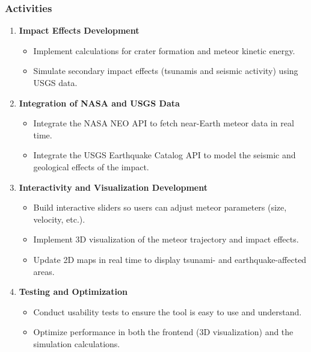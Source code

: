 \documentclass[conference]{IEEEtran}
\begin{document}
\subsubsection*{Activities}
\begin{enumerate}
	\item \textbf{Impact Effects Development}
	      \begin{itemize}
		      \item Implement calculations for crater formation and meteor kinetic
		            energy.
		      \item Simulate secondary impact effects (tsunamis and seismic activity)
		            using USGS data.
	      \end{itemize}
	\item \textbf{Integration of NASA and USGS Data}
	      \begin{itemize}
		      \item Integrate the NASA NEO API to fetch near-Earth meteor data in
		            real time.
		      \item Integrate the USGS Earthquake Catalog API to model the seismic and
		            geological effects of the impact.
	      \end{itemize}
	\item \textbf{Interactivity and Visualization Development}
	      \begin{itemize}
		      \item Build interactive sliders so users can adjust meteor parameters
		            (size, velocity, etc.).
		      \item Implement 3D visualization of the meteor trajectory and impact
		            effects.
		      \item Update 2D maps in real time to display tsunami- and
		            earthquake-affected areas.
	      \end{itemize}
	\item \textbf{Testing and Optimization}
	      \begin{itemize}
		      \item Conduct usability tests to ensure the tool is easy to use and
		            understand.
		      \item Optimize performance in both the frontend (3D visualization) and
		            the simulation calculations.
	      \end{itemize}
\end{enumerate}
\end{document}
